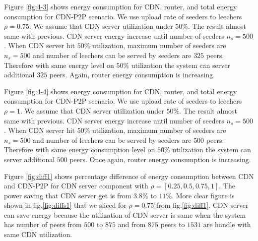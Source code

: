 \documentclass[conference]{IEEEtran}
\begin{document}
Figure \ref{fig:4-3} shows energy consumption for CDN, router, and total energy consumption for CDN-P2P scenario.  
We use upload rate of seeders to leechers $\rho=0.75$.
We assume that CDN server utilization under $50\%$.
The result almost same with previous. 
CDN server energy increase until number of seeders $n_s=500$.
When CDN server hit $50\%$ utilization, maximum number of seeders are $n_s=500$ and number of leechers can be served by seeders are $325$ peers. 
Therefore with same energy level on $50\%$ utilization the system can server additional $325$ peers. 
Again, router energy consumption is increasing. 

Figure \ref{fig:4-4} shows energy consumption for CDN, router, and total energy consumption for CDN-P2P scenario.  
We use upload rate of seeders to leechers $\rho=1$.
We assume that CDN server utilization under $50\%$.
The result almost same with previous. 
CDN server energy increase until number of seeders $n_s=500$.
When CDN server hit $50\%$ utilization, maximum number of seeders are $n_s=500$ and number of leechers can be served by seeders are $500$ peers. 
Therefore with same energy consumption level on $50\%$ utilization the system can server additional $500$ peers. 
Once again, router energy consumption is increasing. 





Figure \ref{fig:diff1} shows percentage difference of energy consumption between CDN and CDN-P2P for CDN server component with $\rho=[0.25,0.5,0.75,1]$.
The power saving that CDN server get is from $3.8\%$ to $11\%$.
More clear figure is shown in fig.\ref{fig:diffs1} that we sliced for $\rho=0.75$ from fig.\ref{fig:diff1}. 
CDN server can save energy because the utilization of CDN server is same when the system has number of peers from $500$ to $875$ and from $875$ peers to $1531$ are handle with same CDN utilization.   
\end{document}
